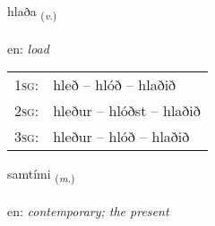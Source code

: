 \documentclass[frontgrid, backgrid]{flacards}\usepackage[]{graphicx}\usepackage[]{xcolor}
\begin{document}
\renewcommand{\flhead}{\vskip5pt \fboxsep=0pt {\small\bfseries\footnotesize Sagnorð | Verb}}
\renewcommand{\fcfoot}{\vskip5pt \fboxsep=0pt \hspace{2pt}{\small\bfseries\footnotesize 3K}}

\renewcommand{\blhead}{\vskip5pt {\small\bfseries\footnotesize Sagnorð | Verb }}
\renewcommand{\bcfoot}{\vskip5pt \hspace{2pt}{\small\bfseries\footnotesize 3K}}


{hlaða \small{\textsubscript{(\textit{v.})}} \\[1ex] %
\textphonetic{[l̥aːða]} \\
en: \emph{load} \\  [2ex]
\renewcommand*{\arraystretch}{0.8}
\begin{tabular}{p{1cm}l}
\textsc{1sg}: & hleð -- hlóð -- hlaðið \\ 
\textsc{2sg}: & hleður -- hlóðst -- hlaðið \\ 
\textsc{3sg}: & hleður -- hlóð -- hlaðið \\ 
\end{tabular}
}

\renewcommand{\flhead}{\vskip5pt \fboxsep=0pt {\small\bfseries\footnotesize Nafnorð | Noun}}
\renewcommand{\fcfoot}{\vskip5pt \fboxsep=0pt \hspace{2pt}{\small\bfseries\footnotesize 3K}}

\renewcommand{\blhead}{\vskip5pt {\small\bfseries\footnotesize Nafnorð | Noun }}
\renewcommand{\bcfoot}{\vskip5pt \hspace{2pt}{\small\bfseries\footnotesize 3K}}


{samtími \small{\textsubscript{(\textit{m.})}} \\[1ex] %
\textphonetic{[samtʰimɪ]} \\
en: \emph{contemporary; the present} \\  [2ex]
\renewcommand*{\arraystretch}{0.8}
}
\end{document}
